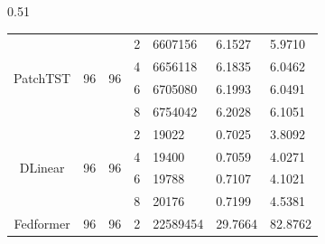 \begin{table}[h]
\begin{subtable}{0.51\textwidth}
{\begin{tabular}{cccllll}
                                        \midrule
            \multirow{4}{*}{PatchTST}   & \multirow{4}{*}{96}     & \multirow{4}{*}{96}      & 2   & 6607156                                    & 6.1527                                   & 5.9710                                       \\
                                        &                         &                          & 4   & 6656118                                    & 6.1835                                   & 6.0462                                       \\
                                        &                         &                          & 6   & 6705080                                    & 6.1993                                  & 6.0491                                       \\
                                        &                         &                          & 8   & 6754042                                    & 6.2028                                   & 6.1051                                       \\
                                        \midrule
            \multirow{4}{*}{DLinear}    & \multirow{4}{*}{96}     & \multirow{4}{*}{96}      & 2   & 19022                                      & 0.7025                                   & 3.8092                                       \\
                                        &                         &                          & 4   & 19400                                      & 0.7059                                  & 4.0271                                       \\
                                        &                         &                          & 6   & 19788                                      & 0.7107                                   & 4.1021                                       \\
                                        &                         &                          & 8   & 20176                                      & 0.7199                                   & 4.5381                                       \\
                                        \midrule
            \multirow{4}{*}{Fedformer}  & \multirow{4}{*}{96}     & \multirow{4}{*}{96}      & 2   & 22589454                                   & 29.7664                                   & 82.8762                                       \\

\end{tabular}}
\end{subtable}
\end{table}
